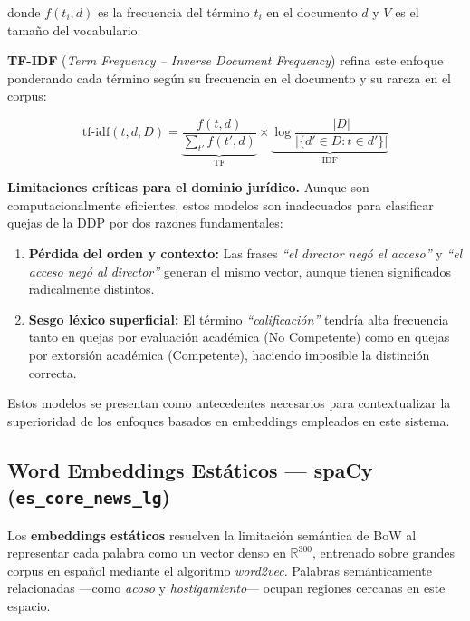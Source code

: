 donde $f(t_i, d)$ es la frecuencia del término $t_i$ en el documento $d$ y $V$
es el tamaño del vocabulario.

\textbf{TF-IDF} (\textit{Term Frequency -- Inverse Document Frequency}) refina
este enfoque ponderando cada término según su frecuencia en el documento y su
rareza en el corpus:

\begin{equation}
  \text{tf-idf}(t, d, D)
  = \underbrace{\frac{f(t, d)}{\sum_{t'} f(t', d)}}_{\text{TF}}
    \times
    \underbrace{\log \frac{|D|}{|\{d' \in D : t \in d'\}|}}_{\text{IDF}}
  \label{eq:tfidf}
\end{equation}

\noindent\textbf{Limitaciones críticas para el dominio jurídico.} Aunque son
computacionalmente eficientes, estos modelos son inadecuados para clasificar
quejas de la DDP por dos razones fundamentales:

\begin{enumerate}
  \item \textbf{Pérdida del orden y contexto:} Las frases \textit{``el director
        negó el acceso''} y \textit{``el acceso negó al director''} generan el
        mismo vector, aunque tienen significados radicalmente distintos.
  \item \textbf{Sesgo léxico superficial:} El término \textit{``calificación''}
        tendría alta frecuencia tanto en quejas por evaluación académica (No
        Competente) como en quejas por extorsión académica (Competente), haciendo
        imposible la distinción correcta.
\end{enumerate}

Estos modelos se presentan como antecedentes necesarios para contextualizar la
superioridad de los enfoques basados en embeddings empleados en este sistema.

\subsection{Word Embeddings Estáticos — spaCy (\texttt{es\_core\_news\_lg})}

Los \textbf{embeddings estáticos} resuelven la limitación semántica de BoW al
representar cada palabra como un vector denso en $\mathbb{R}^{300}$, entrenado
sobre grandes corpus en español mediante el algoritmo \textit{word2vec}.\cite{mikolov2013}
Palabras semánticamente relacionadas —como \textit{acoso} y
\textit{hostigamiento}— ocupan regiones cercanas en este espacio.

